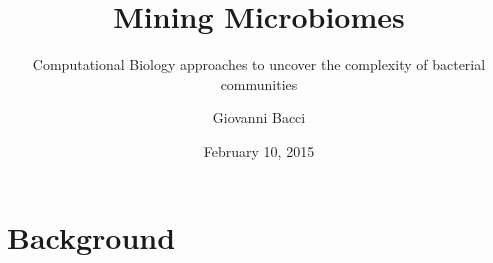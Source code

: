 \documentclass[10pt]{beamer}
\author{Giovanni Bacci}
\title{Mining Microbiomes}
\subtitle{Computational Biology approaches to uncover the complexity of bacterial communities}
\institute{University of Florence\\
CRA-RPS}
\date{February 10, 2015}
\begin{document}
\begin{frame}[plain]
\titlepage
\end{frame}

\section{Background}
\subsection{}

\end{document}
